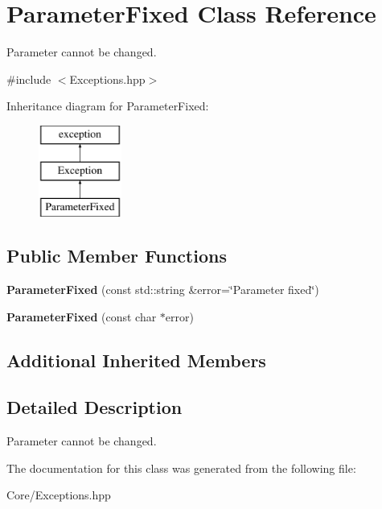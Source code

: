 \hypertarget{class_parameter_fixed}{\section{Parameter\-Fixed Class Reference}
\label{class_parameter_fixed}
}


Parameter cannot be changed.  




{\ttfamily \#include $<$Exceptions.\-hpp$>$}

Inheritance diagram for Parameter\-Fixed\-:\begin{figure}[H]
\begin{center}
\leavevmode
\includegraphics[height=3.000000cm]{class_parameter_fixed}
\end{center}
\end{figure}
\subsection*{Public Member Functions}
\begin{DoxyCompactItemize}
\item 
\hypertarget{class_parameter_fixed_a8cf94b1291ddf3f3cfc141cec838bc76}{{\bfseries Parameter\-Fixed} (const std\-::string \&error=\char`\"{}Parameter fixed\char`\"{})}\label{class_parameter_fixed_a8cf94b1291ddf3f3cfc141cec838bc76}

\item 
\hypertarget{class_parameter_fixed_a9c2d90f71393ad23e89219a791b24d5e}{{\bfseries Parameter\-Fixed} (const char $\ast$error)}\label{class_parameter_fixed_a9c2d90f71393ad23e89219a791b24d5e}

\end{DoxyCompactItemize}
\subsection*{Additional Inherited Members}


\subsection{Detailed Description}
Parameter cannot be changed. 

The documentation for this class was generated from the following file\-:\begin{DoxyCompactItemize}
\item 
Core/Exceptions.\-hpp\end{DoxyCompactItemize}
